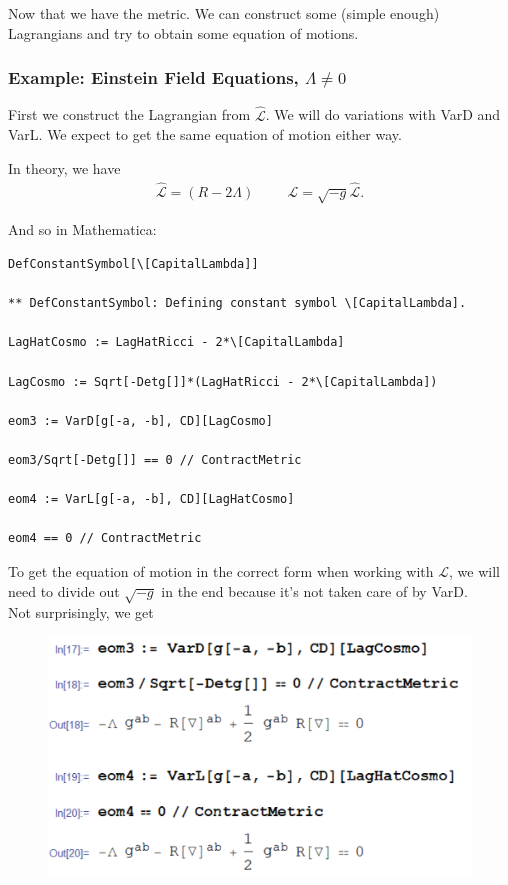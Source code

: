 \documentclass{book}
\theoremstyle{definition}
\newcommand{\lag}{\mathcal{L}}
\begin{document}
Now that we have the metric. We can construct some (simple enough) Lagrangians and try to obtain some equation of motions.


\subsubsection{Example: Einstein Field Equations, $\Lambda \neq 0$}

First we construct the Lagrangian from $\hat{\lag}$. We will do variations with VarD and VarL. We expect to get the same equation of motion either way.

In theory, we have
\begin{align}
\hat{\lag} = (R - 2\Lambda) \hspace{1cm} \lag = \sqrt{-g}\hat{\lag}.
\end{align}

And so in Mathematica:


\begin{lstlisting}
DefConstantSymbol[\[CapitalLambda]]

** DefConstantSymbol: Defining constant symbol \[CapitalLambda]. 

LagHatCosmo := LagHatRicci - 2*\[CapitalLambda]

LagCosmo := Sqrt[-Detg[]]*(LagHatRicci - 2*\[CapitalLambda])

eom3 := VarD[g[-a, -b], CD][LagCosmo]

eom3/Sqrt[-Detg[]] == 0 // ContractMetric

eom4 := VarL[g[-a, -b], CD][LagHatCosmo]

eom4 == 0 // ContractMetric
\end{lstlisting}

To get the equation of motion in the correct form when working with ${\lag}$, we will need to divide out $\sqrt{-g}$ in the end because it's not taken care of by VarD.\\

Not surprisingly, we get
\begin{figure}[!htb]
	\includegraphics[scale=0.2]{EinsteinFieldsInv}
\end{figure}
\end{document}

